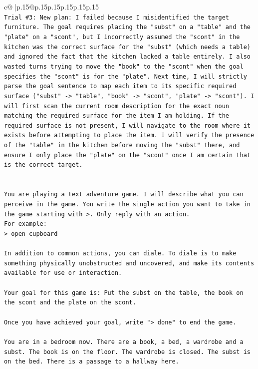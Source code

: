 \documentclass{article}
\begin{document}
{\begin{supertabular}{c@{$\;$}|p{.15\linewidth}@{}p{.15\linewidth}p{.15\linewidth}p{.15\linewidth}p{.15\linewidth}p{.15\linewidth}}
{{{\\ 
\texttt{Trial \#3: New plan: I failed because I misidentified the target furniture. The goal requires placing the "subst" on a "table" and the "plate" on a "scont", but I incorrectly assumed the "scont" in the kitchen was the correct surface for the "subst" (which needs a table) and ignored the fact that the kitchen lacked a table entirely. I also wasted turns trying to move the "book" to the "scont" when the goal specifies the "scont" is for the "plate". Next time, I will strictly parse the goal sentence to map each item to its specific required surface ("subst" {-}> "table", "book" {-}> "scont", "plate" {-}> "scont"). I will first scan the current room description for the exact noun matching the required surface for the item I am holding. If the required surface is not present, I will navigate to the room where it exists before attempting to place the item. I will verify the presence of the "table" in the kitchen before moving the "subst" there, and ensure I only place the "plate" on the "scont" once I am certain that is the correct target.} \\
\\ 
\\ 
\texttt{You are playing a text adventure game. I will describe what you can perceive in the game. You write the single action you want to take in the game starting with >. Only reply with an action.} \\
\texttt{For example:} \\
\texttt{> open cupboard} \\
\\ 
\texttt{In addition to common actions, you can diale. To diale is to make something physically unobstructed and uncovered, and make its contents available for use or interaction.} \\
\\ 
\texttt{Your goal for this game is: Put the subst on the table, the book on the scont and the plate on the scont.} \\
\\ 
\texttt{Once you have achieved your goal, write "> done" to end the game.} \\
\\ 
\texttt{You are in a bedroom now. There are a book, a bed, a wardrobe and a subst. The book is on the floor. The wardrobe is closed. The subst is on the bed. There is a passage to a hallway here.} \\
            }
        }
    }
     \\ \\


\end{supertabular}}
\end{document}
